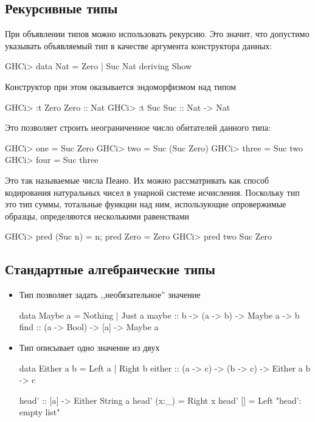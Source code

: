 \documentclass[11pt,a4paper]{article}
\begin{document}
\subsection{Рекурсивные типы}
При объявлении типов можно использовать рекурсию. Это значит, что допустимо указывать объявляемый тип в качестве аргумента конструктора данных:
\begin{hscode}
GHCi> data Nat = Zero | Suc Nat deriving Show
\end{hscode}
Конструктор  при этом оказывается эндоморфизмом над типом 
\begin{hscode}
GHCi> :t Zero
Zero :: Nat
GHCi> :t Suc
Suc :: Nat -> Nat
\end{hscode}
Это позволяет строить неограниченное число обитателей данного типа:
\begin{hscode}
GHCi> one = Suc Zero
GHCi> two = Suc (Suc Zero)
GHCi> three = Suc two
GHCi> four = Suc three
\end{hscode}
Это так называемые числа Пеано. Их можно рассматривать как способ кодирования натуральных чисел в унарной системе исчисления. Поскольку тип  это тип суммы, тотальные функции над ним, использующие опровержимые образцы, определяются
несколькими равенствами
\begin{hscode}
GHCi> {pred (Suc n) = n; pred Zero = Zero}
GHCi> pred two
Suc Zero
\end{hscode}

\subsection{Стандартные алгебраические типы}
\begin{itemize}
\item Тип  позволяет задать ,,необязательное'' значение
\begin{hscode}
data Maybe a = Nothing | Just a
maybe :: b -> (a -> b) -> Maybe a -> b
find :: (a -> Bool) -> [a] -> Maybe a
\end{hscode}
\item Тип  описывает одно значение из двух
\begin{hscode}
data Either a b = Left a | Right b
either :: (a -> c) -> (b -> c) -> Either a b -> c

head' :: [a] -> Either String a
head' (x:_) = Right x
head' [] = Left "head': empty list"
\end{hscode}
\end{itemize}
\end{document}
